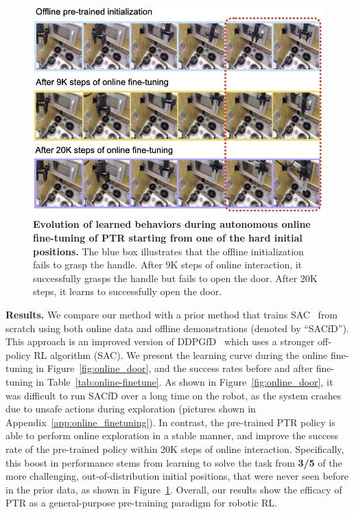 \begin{figure}
\vspace{-0.4cm}
\centering
\includegraphics[width=0.85\linewidth]{chapters/ptr/online_improvement.png}
\vspace{-0.24cm}
\caption{\footnotesize{\label{fig:online-improvement} \textbf{Evolution of learned behaviors during autonomous online fine-tuning of PTR starting from one of the hard initial positions.} The blue box illustrates that the offline initialization fails to grasp the handle. After 9K steps of online interaction, it successfully grasps the handle but fails to open the door. After 20K steps, it learns to successfully open the door.}}
\vspace{-0.4cm}
\end{figure}

\textbf{Results.} We compare our method with a prior method that trains SAC~\citep{haarnoja2018soft} from scratch using both online data and offline demonstrations (denoted by ``SACfD''). This approach is an improved version of DDPGfD~\citep{vecerik2017leveraging} which uses a stronger off-policy RL algorithm (SAC). We present the learning curve during the online fine-tuning in Figure~\ref{fig:online_door}, and the success rates before and after fine-tuning in Table~\ref{tab:online-finetune}. As shown in Figure~\ref{fig:online_door}, it was difficult to run SACfD over a long time on the robot, as the system crashes due to unsafe actions during exploration (pictures shown in Appendix~\ref{app:online_finetuning}). In contrast, the pre-trained PTR policy is able to perform online exploration in a stable manner, and improve the success rate of the pre-trained policy within 20K steps of online interaction. Specifically, this boost in performance stems from learning to solve the task from \textbf{3/5} of the more challenging, out-of-distribution initial positions,
that were never seen before in the prior data, as shown in Figure~\ref{fig:online-improvement}. Overall, our results show the efficacy of PTR as a general-purpose pre-training paradigm for robotic RL. 